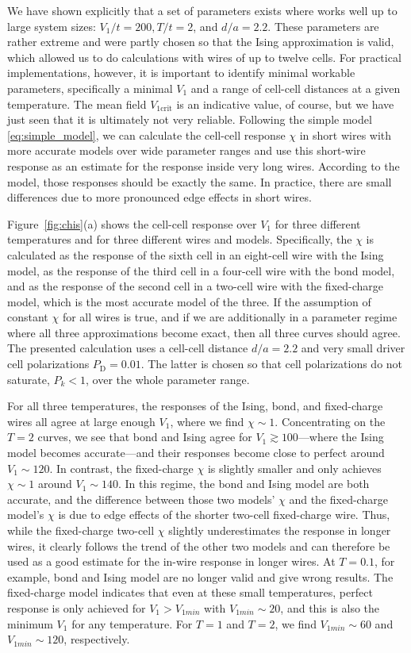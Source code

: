 We have shown explicitly that a set of parameters exists where  works
well up to large system sizes: $V_1/t = 200, T/t = 2$, and $d/a = 2.2$. These
parameters are rather extreme and were partly chosen so that the Ising
approximation is valid, which allowed us to do calculations with wires of up to
twelve cells. For practical  implementations, however, it is important
to identify minimal workable parameters, specifically a minimal $V_1$ and a
range of cell-cell distances at a given temperature. The mean field
$V_{1\textrm{crit}}$ is an indicative value, of course, but we have just seen
that it is ultimately not very reliable. Following the simple model
\eqref{eq:simple_model}, we can calculate the cell-cell response $\chi$ in short
wires with more accurate models over wide parameter ranges and use this
short-wire response as an estimate for the response inside very long wires.
According to the model, those responses should be exactly the same. In practice,
there are small differences due to more pronounced edge effects in short wires.

Figure~\ref{fig:chis}(a) shows the cell-cell response over $V_1$ for three
different temperatures and for three different wires and models. Specifically,
the $\chi$ is calculated as the response of the sixth cell in an eight-cell wire
with the Ising model, as the response of the third cell in a four-cell wire with
the bond model, and as the response of the second cell in a two-cell wire with
the fixed-charge model, which is the most accurate model of the three. If the
assumption of constant $\chi$ for all wires is true, and if we are additionally
in a parameter regime where all three approximations become exact, then all
three curves should agree. The presented calculation uses a cell-cell distance
$d/a = 2.2$ and very small driver cell polarizations $P_\text{D} = 0.01$. The latter is
chosen so that cell polarizations do not saturate, $P_k < 1$, over the whole
parameter range.

For all three temperatures, the responses of the Ising, bond, and fixed-charge
wires all agree at large enough $V_1$, where we find $\chi \sim 1$.
Concentrating on the $T = 2$ curves, we see that bond and Ising agree for $V_1
\gtrsim 100$---where the Ising model becomes accurate---and their responses
become close to perfect around $V_1 \sim 120$. In contrast, the fixed-charge
$\chi$ is slightly smaller and only achieves $\chi \sim 1$ around $V_1 \sim
140$. In this regime, the bond and Ising model are both accurate, and the
difference between those two models' $\chi$ and the fixed-charge model's $\chi$
is due to edge effects of the shorter two-cell fixed-charge wire. Thus, while
the fixed-charge two-cell $\chi$ slightly underestimates the response in longer
wires, it clearly follows the trend of the other two models and can therefore be
used as a good estimate for the in-wire response in longer wires. At $T = 0.1$,
for example, bond and Ising model are no longer valid and give wrong results.
The fixed-charge model indicates that even at these small temperatures, perfect
response is only achieved for $V_1 > V_{1min}$ with $V_{1min} \sim 20$, and this
is also the minimum $V_1$ for any temperature. For $T = 1$ and $T = 2$, we find
$V_{1min} \sim 60$ and $V_{1min} \sim 120$, respectively.

